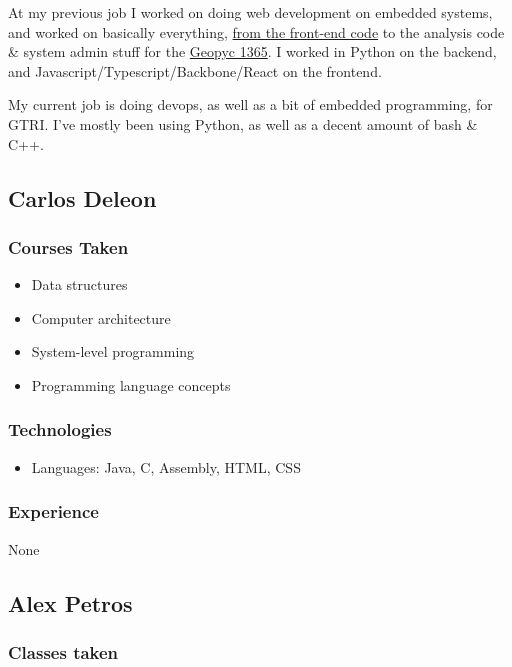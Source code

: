 \documentclass[
10pt, %
a4paper, %
oneside, %
headinclude,footinclude, %
BCOR5mm, %
]{scrartcl}
\begin{document}
At my previous job I worked on doing web development on embedded
systems, and worked on basically everything,
\href{https://www.micromeritics.com/Repository/Files/Envelope-Density-Report.jpg}{from
the front-end code} to the analysis code \& system admin stuff for the
\href{https://www.youtube.com/watch?v=TdUiYWuejVI}{Geopyc 1365}. I
worked in Python on the backend, and
Javascript/Typescript/Backbone/React on the frontend.

My current job is doing devops, as well as a bit of embedded
programming, for GTRI\@. I've mostly been using Python, as well as a
decent amount of bash \& C++.

\subsection{Carlos Deleon}

\subsubsection{Courses Taken}

\begin{itemize}
\item
  Data structures
\item
  Computer architecture
\item
  System-level programming
\item
  Programming language concepts
\end{itemize}

\subsubsection{Technologies}

\begin{itemize}
\item
  Languages: Java, C, Assembly, HTML, CSS
\end{itemize}

\subsubsection{Experience}

None

\subsection{Alex Petros}

\subsubsection{Classes taken}
\end{document}
